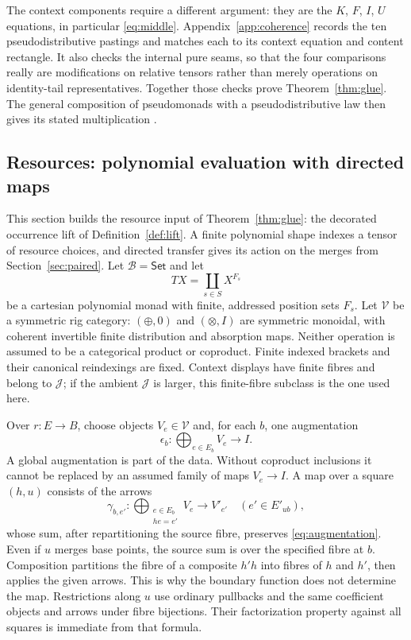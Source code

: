 \documentclass[11pt]{article}
\numberwithin{equation}{section}
\theoremstyle{definition}\newtheorem{definition}[theorem]{Definition}
\newcommand{\B}{\mathcal B}\newcommand{\J}{\mathcal J}
\newcommand{\V}{\mathcal V}\newcommand{\Set}{\mathsf{Set}}\newcommand{\Cat}{\mathsf{Cat}}
\begin{document}
The context components require a different argument: they are the $K$,
$F$, $I$, $U$ equations, in particular \eqref{eq:middle}. Appendix~\ref{app:coherence}
records the ten pseudodistributive pastings and matches each to its
context equation and content rectangle. It also checks the internal pure
seams, so that the four comparisons really are modifications on relative
tensors rather than merely operations on identity-tail representatives.
Together those checks prove Theorem~\ref{thm:glue}. The general composition
of pseudomonads with a pseudodistributive law then gives its stated
multiplication \cite[Def.~4.1 and App.~A]{GL}.

\subsection{Resources: polynomial evaluation with directed maps}\label{sec:resources}
This section builds the resource input of Theorem~\ref{thm:glue}:
the decorated occurrence lift of Definition~\ref{def:lift}. A finite
polynomial shape indexes a tensor of resource choices, and directed
transfer gives its action on the merges from Section~\ref{sec:paired}.
Let $\B=\Set$ and let
\[
                    TX=\coprod_{s\in S}X^{F_s}
\]
be a cartesian polynomial monad with finite, addressed position sets $F_s$.
Let $\V$ be a symmetric rig category: $(\oplus,0)$ and $(\otimes,I)$
are symmetric monoidal, with coherent invertible finite distribution and
absorption maps. Neither operation is assumed to be a categorical product
or coproduct. Finite indexed brackets and their canonical reindexings are
fixed. Context displays have finite fibres and belong to $\J$; if the
ambient $\J$ is larger, this finite-fibre subclass is the one used here.

Over $r:E\to B$, choose objects $V_e\in\V$ and, for each $b$, one
augmentation
\begin{equation}\label{eq:augmentation}
                  \epsilon_b:\bigoplus_{e\in E_b}V_e\longrightarrow I.
\end{equation}
A global augmentation is part of the data. Without coproduct inclusions
it cannot be replaced by an assumed family of maps $V_e\to I$.
A map over a square $(h,u)$ consists of the arrows
\begin{equation}\label{eq:aggregation}
 \gamma_{b,e'}:\bigoplus_{\substack{e\in E_b\\he=e'}}V_e
                         \longrightarrow V'_{e'}
       \quad(e'\in E'_{ub}),
\end{equation}
whose sum, after repartitioning the source fibre, preserves
\eqref{eq:augmentation}. Even if $u$ merges base points, the source sum
is over the specified fibre at $b$. Composition partitions the fibre of
a composite $h'h$ into fibres of $h$ and $h'$, then applies the given
arrows. This is why the boundary function does not determine the map.
Restrictions along $u$ use ordinary pullbacks and the same coefficient
objects and arrows under fibre bijections. Their factorization property
against all squares is immediate from that formula.
\end{document}
